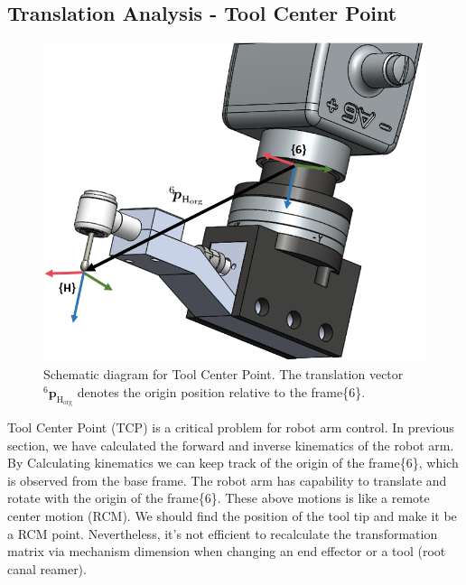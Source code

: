 \subsection{Translation Analysis - Tool Center Point}
\label{sec:tcp}
\begin{figure}[htbp]
\begin{center}
\includegraphics[width=0.7\linewidth]{Images/TCP.png}
\end{center}
\caption{
Schematic diagram for Tool Center Point. The translation vector $^\mathrm{6}\!\boldsymbol{p}_\mathrm{H_{org}}$ denotes the origin position relative to the frame\{6\}.
}\label{fig:tcp}
\end{figure}
Tool Center Point (TCP) is a critical problem for robot arm control. In previous section, we have calculated the forward and inverse kinematics of the robot arm. By Calculating kinematics we can keep track of the origin of the frame\{6\}, which is observed from the base frame. The robot arm has capability to translate and rotate with the origin of the frame\{6\}. These above motions is like a remote center motion (RCM). We should find the position of the tool tip and make it be a RCM point. Nevertheless, it's not efficient to recalculate the transformation matrix via mechanism dimension when changing an end effector or a tool (root canal reamer).

